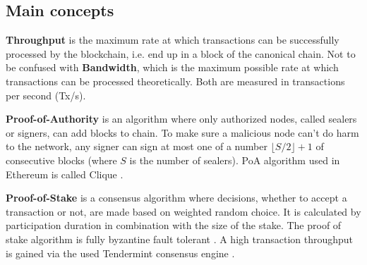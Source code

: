 \subsection{Main concepts}

\textbf{Throughput} is the maximum rate at which transactions can be successfully processed by the blockchain, i.e. end up in a block of the canonical chain. Not to be confused with \textbf{Bandwidth}, which is the maximum possible rate at which transactions can be processed theoretically. Both are measured in transactions per second (Tx/s).

\textbf{Proof-of-Authority} is an algorithm where only authorized nodes, called sealers or signers, can add blocks to chain. To make sure a malicious node can’t do harm to the network, any signer can sign at most one of a number $\lfloor S/2 \rfloor + 1$ of consecutive blocks (where $S$ is the number of sealers). PoA algorithm used in Ethereum is called Clique \cite{clique}.

\textbf{Proof-of-Stake} is a consensus algorithm where decisions, whether to accept a transaction or not, are made based on weighted random choice. It is calculated by participation
duration in combination with the size of the stake. The proof of stake algorithm is fully byzantine fault tolerant \cite{pos}. A high transaction throughput is
gained via the used Tendermint consensus engine \cite{burrow_git}.
